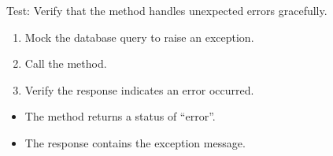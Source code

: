 \documentclass[letterpaper,10pt,english]{sphinxmanual}
\begin{document}
\begin{fulllineitems}
\label{\detokenize{test:test.test_admin.test_login_admin_unexpected_error}}
\pysigstartsignatures
\pysiglinewithargsret
{}
{\sphinxparamcomma {}}
{}
\pysigstopsignatures
\sphinxAtStartPar
Test: Verify that the method handles unexpected errors gracefully.
\begin{description}
\begin{enumerate}
%
\item {} 
\sphinxAtStartPar
Mock the database query to raise an exception.

\item {} 
\sphinxAtStartPar
Call the  method.

\item {} 
\sphinxAtStartPar
Verify the response indicates an error occurred.

\end{enumerate}

\begin{itemize}
\item {} 
\sphinxAtStartPar
The method returns a status of “error”.

\item {} 
\sphinxAtStartPar
The response contains the exception message.

\end{itemize}

\end{description}

\end{fulllineitems}

\end{document}
